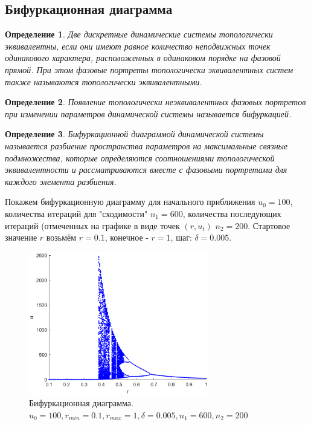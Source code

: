 \documentclass[12pt]{article}
\newtheorem{definition}{Определение}
\begin{document}
\subsection{Бифуркационная диаграмма}
\begin{definition}
    Две дискретные динамические системы \textit{топологически эквивалентны}, если они имеют равное количество неподвижных точек одинакового характера, расположенных в одинаковом порядке на фазовой прямой. При этом фазовые портреты топологически эквивалентных систем также называются \textit{топологически эквивалентными}.
\end{definition}
\begin{definition}
    Появление топологически неэквивалентных фазовых портретов при изменении параметров динамической системы называется \textit{бифуркацией}.
\end{definition}
\begin{definition}
    \textit{Бифуркационной диаграммой} динамической системы называется разбиение пространства параметров на максимальные связные подмножества, которые определяются соотношениями топологической эквивалентности и рассматриваются вместе с фазовыми портретами для каждого элемента разбиения.
\end{definition}
Покажем бифуркационную диаграмму для начального приближения $u_0 = 100$, количества итераций для "сходимости" $n_1 = 600$, количества последующих итераций (отмеченных на графике в виде точек $(r, u_t)$ $n_2 = 200$. Стартовое значение $r$ возьмём $r = 0.1$, конечное - $r = 1$, шаг: $\delta = 0.005$.
\begin{figure} [H]
    \begin{center}
    \includegraphics[width=0.7\textwidth]{bifurc.eps}
    \caption{Бифуркационная диаграмма. $u_0 = 100, r_{min} = 0.1, r_{max} = 1, \delta = 0.005, n_1 = 600, n_2 = 200$}
    \label{pic7}
    \end{center}
\end{figure}
\end{document}
